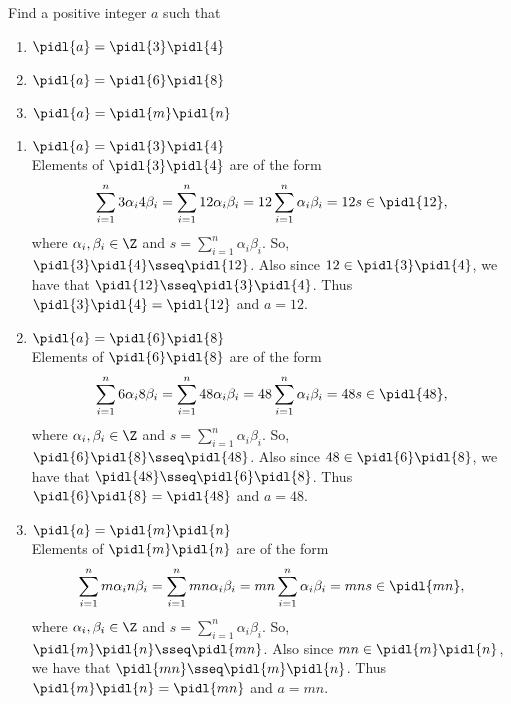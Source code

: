\documentclass{article}
\begin{document}
Find a positive integer \( a \) such that
\begin{enumerate}[label=\bd{\alph*.}]
  \item \( \pidl{a} = \pidl{3}\pidl{4} \)
  \item \( \pidl{a} = \pidl{6}\pidl{8} \)
  \item \( \pidl{a} = \pidl{m}\pidl{n} \)
\end{enumerate}

\begin{solution} %
\begin{enumerate}[label=\bd{\alph*.}]
  \item \( \pidl{a} = \pidl{3}\pidl{4} \)\\
    Elements of \( \pidl{3}\pidl{4} \) are of the form \begin{align*}
      \sum_{i=1}^{n}3\alpha_i4\beta_i = \sum_{i=1}^{n}12\alpha_i\beta_i = 12\sum_{i=1}^{n}\alpha_i\beta_i = 12s \in \pidl{12},
    \end{align*}
    where \( \alpha_i,\beta_i\in \Z \) and \( s=\sum_{i=1}^{n}\alpha_i\beta_i \).
    So, \( \pidl{3}\pidl{4} \sseq \pidl{12} \).
    Also since \( 12\in \pidl{3}\pidl{4} \), we have that \( \pidl{12}\sseq \pidl{3}\pidl{4} \).
    Thus \( \pidl{3}\pidl{4} = \pidl{12} \) and \( a=12 \).
  \item \( \pidl{a} = \pidl{6}\pidl{8} \)\\
    Elements of \( \pidl{6}\pidl{8} \) are of the form \begin{align*}
      \sum_{i=1}^{n}6\alpha_i8\beta_i = \sum_{i=1}^{n}48\alpha_i\beta_i = 48\sum_{i=1}^{n}\alpha_i\beta_i = 48s \in \pidl{48},
    \end{align*} where \( \alpha_i,\beta_i\in \Z \) and \( s=\sum_{i=1}^{n}\alpha_i\beta_i \).
    So, \( \pidl{6}\pidl{8} \sseq \pidl{48} \).
    Also since \( 48\in \pidl{6}\pidl{8} \), we have that \( \pidl{48}\sseq \pidl{6}\pidl{8} \).
    Thus \( \pidl{6}\pidl{8} = \pidl{48} \) and \( a=48 \).
  \item \( \pidl{a} = \pidl{m}\pidl{n} \)\\
    Elements of \( \pidl{m}\pidl{n} \) are of the form \begin{align*}
      \sum_{i=1}^{n}m\alpha_in\beta_i = \sum_{i=1}^{n}mn\alpha_i\beta_i = mn\sum_{i=1}^{n}\alpha_i\beta_i = mn s \in \pidl{mn},
    \end{align*} where \( \alpha_i,\beta_i\in \Z \) and \( s=\sum_{i=1}^{n}\alpha_i\beta_i \).
    So, \( \pidl{m}\pidl{n}\sseq \pidl{mn} \).
    Also since \( mn\in \pidl{m}\pidl{n} \), we have that \( \pidl{mn}\sseq\pidl{m}\pidl{n} \).
    Thus \( \pidl{m}\pidl{n} = \pidl{mn} \) and \( a=mn \).
\end{enumerate}
\end{solution}
\end{document}
